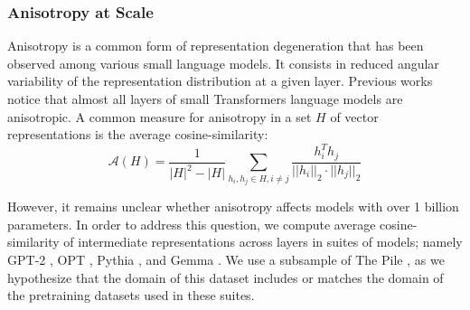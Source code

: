 \subsubsection{Anisotropy at Scale}
Anisotropy is a common form of representation degeneration that has been observed among various small language models. It consists in reduced angular variability of the representation distribution at a given layer. Previous works \citep{ethayarajh-2019-contextual,godey2024anisotropy} notice that almost all layers of small Transformers language models are anisotropic. A common measure for anisotropy in a set $H$ of vector representations is the average cosine-similarity:
$$
\mathcal{A}(H) = \frac{1}{|H|^2 - |H|} \sum_{h_i, h_j \in H, i \neq j} \frac{h_i^Th_j}{||h_i||_2 \cdot ||h_j||_2}
$$

However, it remains unclear whether anisotropy affects models with over 1 billion parameters. In order to address this question, we compute average cosine-similarity of intermediate representations across layers in suites of models; namely GPT-2 \citep{radford2019language}, OPT \citep{zhang2022opt}, Pythia \citep{biderman2023pythia}, and Gemma \citep{gemmateam2024gemma}. We use a subsample of The Pile \citep{gao2020pile}, as we hypothesize that the domain of this dataset includes or matches the domain of the pretraining datasets used in these suites.

